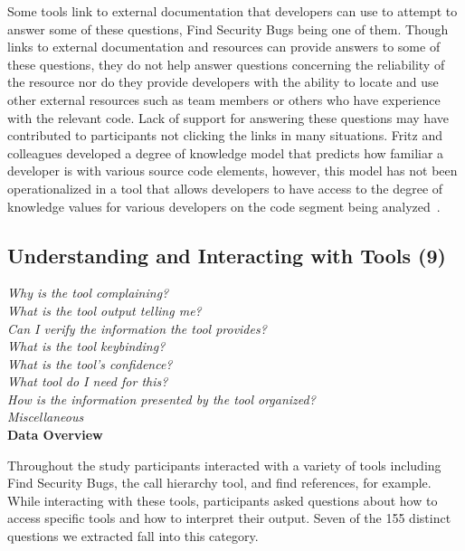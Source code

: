 \documentclass[conference]{IEEEtran}
\begin{document}
Some tools link to external documentation that developers can use to attempt to answer some of these questions, Find Security Bugs being one of them. 
Though links to external documentation and resources can provide answers to some of these questions, they do not help answer questions concerning the reliability of the resource nor do they provide developers with the ability to locate and use other external resources such as team members or others who have experience with the relevant code.
Lack of support for answering these questions may have contributed to participants not clicking the links in many situations.  
Fritz and colleagues developed a degree of knowledge model that predicts how familiar a developer is with various source code elements, however, this model has not been operationalized in a tool that allows developers to have access to the degree of knowledge values for various developers on the code segment being analyzed~\cite{fritz2010degree}.




\noindent\subsection{\textbf{Understanding and Interacting with Tools (9)}}\label{uit}

\noindent\emph{Why is the tool complaining?} \\
\emph{What is the tool output telling me?} \\
\emph{Can I verify the information the tool provides?} \\
\emph{What is the tool keybinding?} \\
\emph{What is the tool's confidence?} \\
\emph{What tool do I need for this?} \\
\emph{How is the information presented by the tool organized?} \\
\emph{Miscellaneous} \\


\noindent\textbf{Data Overview}

Throughout the study participants interacted with a variety of tools including Find Security Bugs, the call hierarchy tool, and find references, for example. 
While interacting with these tools, participants asked questions about how to access specific tools and how to interpret their output. 
Seven of the 155 distinct questions we extracted fall into this category.
\\
\end{document}
